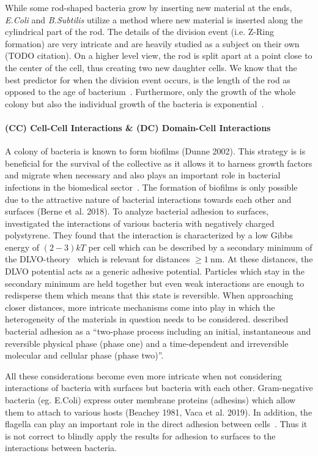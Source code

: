 \documentclass{article}
\begin{document}
While some rod-shaped bacteria grow by inserting new material at the ends, \textit{E.Coli} and
\textit{B.Subtilis} utilize a method where new material is inserted along the cylindrical part of
the rod.
The details of the division event (i.e. Z-Ring formation) are very intricate and are heavily
studied as a subject on their own (TODO citation).
On a higher level view, the rod is split apart at a point close to the center of the cell, thus
creating two new daughter cells.
We know that the best predictor for when the division event occurs, is the length of the rod as
opposed to the age of bacterium~\cite{Robert2014}.
Furthermore, only the growth of the whole colony but also the individual growth of the bacteria is
exponential~\cite{Amir2014,Takeuchi2005}.

\paragraph{(CC) Cell-Cell Interactions \& (DC) Domain-Cell Interactions}
A colony of bacteria is known to form biofilms (Dunne 2002). This strategy is is beneficial for the
survival of the collective as it allows it to harness growth factors and migrate when necessary and
also plays an important role in bacterial infections in the biomedical sector~\cite{Ong1999}.
The formation of biofilms is only possible due to the attractive nature of bacterial interactions
towards each other and surfaces (Berne et al. 2018). To analyze bacterial adhesion to surfaces,
\cite{vanLoosdrecht1989} investigated the interactions of various bacteria with negatively charged
polystyrene.
They found that the interaction is characterized by a low Gibbs energy of $(2 - 3)kT$ per cell
which can be described by a secondary minimum of the DLVO-theory~\cite{Verwey1947,Derjaguin1993}
which is relevant for distances $\geq\SI{1}{\nano\meter}$.
At these distances, the DLVO potential acts as a generic adhesive potential.
Particles which stay in the secondary minimum are held together but even weak interactions are
enough to redisperse them which means that this state is reversible.
When approaching closer distances, more intricate mechanisms come into play in which the
heterogeneity of the materials in question needs to be considered.
\cite{Hori2010} described bacterial adhesion as a “two-phase process including an initial,
instantaneous and reversible physical phase (phase one) and a time-dependent and irreversible
molecular and cellular phase (phase two)”.

All these considerations become even more intricate when not considering interactions of bacteria
with surfaces but bacteria with each other.
Gram-negative bacteria (eg. E.Coli) express outer membrane proteins (adhesins) which allow them to
attach to various hosts (Beachey 1981, Vaca et al. 2019).
In addition, the flagella can play an important role in the direct adhesion between
cells~\cite{Haiko2013}.
Thus it is not correct to blindly apply the results for adhesion to surfaces to the interactions
between bacteria.
\end{document}
